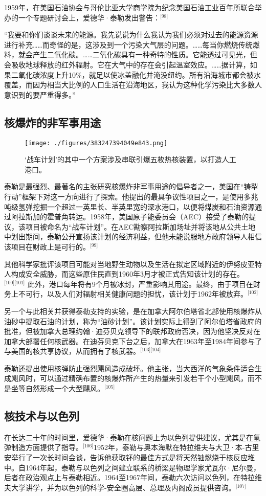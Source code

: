 1959年，在美国石油协会与哥伦比亚大学商学院为纪念美国石油工业百年所联合举办的一个专题研讨会上，爱德华·泰勒发出警告：\(^\text{[98]}\)

“我要和你们谈谈未来的能源。我先说说为什么我认为我们必须对过去的能源资源进行补充……而奇怪的是，这涉及到一个污染大气层的问题。……每当你燃烧传统燃料，就会产生二氧化碳。……二氧化碳具有一种奇特的性质。它能透过可见光，但会吸收地球释放的红外辐射。它在大气中的存在会引起温室效应。……据计算，如果二氧化碳浓度上升10\%，就足以使冰盖融化并淹没纽约。所有沿海城市都会被水覆盖，而因为相当大比例的人口生活在沿海地区，我认为这种化学污染比大多数人意识到的要严重得多。”
\subsection{核爆炸的非军事用途}
\begin{figure}[ht]
\centering
\texttt{[image: ./figures/383247394049e843.png]}
\caption{‘战车计划’的其中一个方案涉及串联引爆五枚热核装置，以打造人工港口。} \label{fig_ADHTL_14}
\end{figure}
泰勒是最强烈、最著名的主张研究核爆炸非军事用途的倡导者之一，美国在“铸犁行动”框架下对这一方向进行了探索。他提出的最具争议性项目之一，是使用多兆吨级氢弹挖掘一个超过一英里长、半英里宽的深水港口，以便将煤炭和石油资源通过阿拉斯加的霍普角转运。1958年，美国原子能委员会（AEC）接受了泰勒的提议，该项目被命名为“战车计划”。在AEC勘察阿拉斯加场址并将该地从公共土地中划出期间，泰勒公开宣扬该计划的经济利益，但他未能说服地方政府领导人相信该项目在财政上是可行的。\(^\text{[99]}\)

其他科学家批评该项目可能对当地野生动物以及生活在拟定区域附近的伊努皮亚特人构成安全威胁，而这些原住民直到1960年3月才被正式告知该计划的存在。\(^\text{[100][101]}\) 此外，港口每年将有9个月被冰封，严重影响其用途。最终，由于项目在财务上不可行，以及人们对辐射相关健康问题的担忧，该计划于1962年被放弃。\(^\text{[102]}\)

另一个与此相关并获得泰勒支持的实验，是在加拿大阿尔伯塔省北部使用核爆炸从油砂中提取石油的计划，称为“油砂计划”。该计划实际上得到了阿尔伯塔省政府的批准，但被加拿大总理约翰·迪芬贝克领导下的联邦政府否决，因为他坚决反对在加拿大部署任何核武器。在迪芬贝克下台之后，加拿大在1963年至1984年间参与了与美国的核共享协议，从而拥有了核武器。\(^\text{[103][104]}\)

泰勒还提出使用核弹防止强烈飓风造成破坏。他主张，当大西洋的气象条件适合生成飓风时，可以通过精确布置的核爆炸所产生的热量来引发若干个小型飓风，而不是坐等自然形成一个大型飓风。\(^\text{[105]}\)
\subsection{核技术与以色列}
在长达二十年的时间里，爱德华·泰勒在核问题上为以色列提供建议，尤其是在氢弹制造方面提供了指导。\(^\text{[106]}\)1952年，泰勒与奥本海默在特拉维夫与大卫·本-古里安举行了一次长时间会谈，告诉他获取钚的最佳方式是将天然铀燃烧于核反应堆中。自1964年起，泰勒与以色列之间建立联系的桥梁是物理学家尤瓦尔·尼尔曼，后者在政治观点上与泰勒相近。1964至1967年间，泰勒六次访问以色列，在特拉维夫大学讲学，并为以色列的科学-安全圈高层、总理及内阁成员提供咨询。\(^\text{[107]}\)

